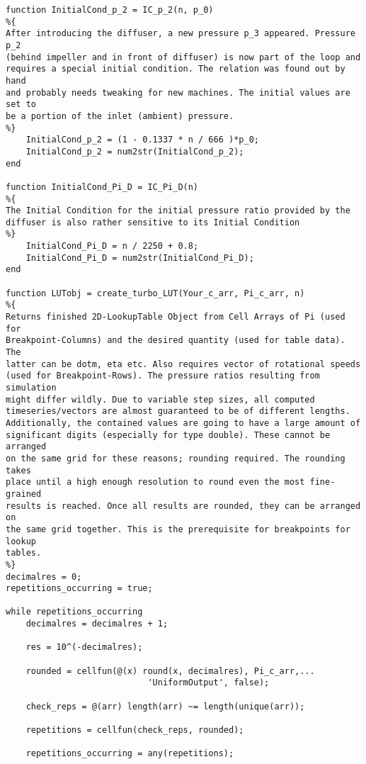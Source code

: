 \begin{lstlisting}
function InitialCond_p_2 = IC_p_2(n, p_0)
%{
After introducing the diffuser, a new pressure p_3 appeared. Pressure p_2
(behind impeller and in front of diffuser) is now part of the loop and
requires a special initial condition. The relation was found out by hand
and probably needs tweaking for new machines. The initial values are set to
be a portion of the inlet (ambient) pressure.
%}
    InitialCond_p_2 = (1 - 0.1337 * n / 666 )*p_0;
    InitialCond_p_2 = num2str(InitialCond_p_2);
end

function InitialCond_Pi_D = IC_Pi_D(n)
%{
The Initial Condition for the initial pressure ratio provided by the
diffuser is also rather sensitive to its Initial Condition
%}
    InitialCond_Pi_D = n / 2250 + 0.8;
    InitialCond_Pi_D = num2str(InitialCond_Pi_D);
end

function LUTobj = create_turbo_LUT(Your_c_arr, Pi_c_arr, n)
%{
Returns finished 2D-LookupTable Object from Cell Arrays of Pi (used for
Breakpoint-Columns) and the desired quantity (used for table data). The
latter can be dotm, eta etc. Also requires vector of rotational speeds
(used for Breakpoint-Rows). The pressure ratios resulting from simulation
might differ wildly. Due to variable step sizes, all computed
timeseries/vectors are almost guaranteed to be of different lengths.
Additionally, the contained values are going to have a large amount of
significant digits (especially for type double). These cannot be arranged
on the same grid for these reasons; rounding required. The rounding takes
place until a high enough resolution to round even the most fine-grained
results is reached. Once all results are rounded, they can be arranged on
the same grid together. This is the prerequisite for breakpoints for lookup
tables.
%}
decimalres = 0;
repetitions_occurring = true;

while repetitions_occurring
    decimalres = decimalres + 1;
    
    res = 10^(-decimalres);
    
    rounded = cellfun(@(x) round(x, decimalres), Pi_c_arr,...
                            'UniformOutput', false);
                        
    check_reps = @(arr) length(arr) ~= length(unique(arr));
                        
    repetitions = cellfun(check_reps, rounded);
    
    repetitions_occurring = any(repetitions);
    

\end{lstlisting}
